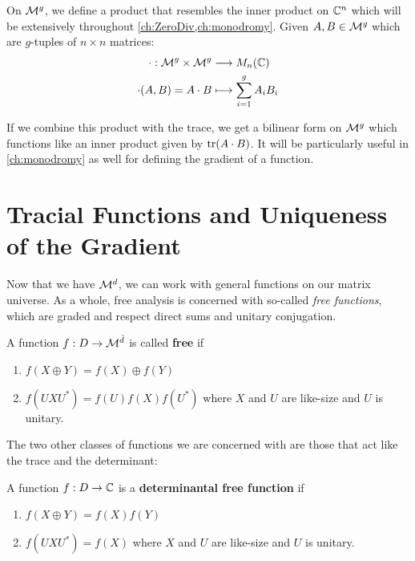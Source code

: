 On \(\mathcal{M}^{g} \), we define a product that resembles the inner product on
\(\mathbb{C}^n\) which will be extensively throughout \cref{ch:ZeroDiv,ch:monodromy}.
Given \(A,B \in \mathcal{M}^{g} \) which are \(g\)-tuples of \(n \times n\) matrices:
\begin{align*}
	\cdot : \mathcal{M}^{g} \times \mathcal{M}^{g}  &\longrightarrow M_n(\mathbb{C}) \\
  \cdot (A,B) = A \cdot B &\longmapsto \sum_{i=1}^g A_i B_i
\end{align*}

If we combine this product with the trace, we get a bilinear form on
\(\mathcal{M}^{g} \) which functions like an inner product given by \(\operatorname{tr}(A \cdot B)\).
It will be particularly useful in \cref{ch:monodromy} as well for defining the
gradient of a function.


\section{Tracial Functions and Uniqueness of the Gradient}%
\label{sec:TracGrad}
Now that we have \(\mathcal{M}^d\), we can work with general functions on our matrix
universe. As a whole, free analysis is concerned with so-called \emph{free
  functions}, which are graded and
respect direct sums and unitary conjugation.

\begin{definition}
\label{def:FreeFun}
  A function \(f: D\to \mathcal{M}^{\hat{d}}\) is called \textbf{free} if
  \begin{enumerate}
    \item \(f(X\oplus Y)= f(X) \oplus f(Y)\)
    \item \(f(U X U^*) = f(U)f(X)f(U^*)\) where \(X\) and \(U\) are like-size
          and \(U\) is unitary.
  \end{enumerate}
\end{definition}

The two other classes of functions we are concerned with are those that act like
the trace and the determinant:
\begin{definition}%
\label{def:DetFreeFun}
  A function \(f: D \to \mathbb{C} \) is a \textbf{determinantal free function} if
  \begin{enumerate}
    \item \(f(X\oplus Y) = f(X)f(Y)\)
    \item \(f(U X U^*) = f(X)\) where \(X\) and \(U\) are like-size
          and \(U\) is unitary.
  \end{enumerate}
\end{definition}

